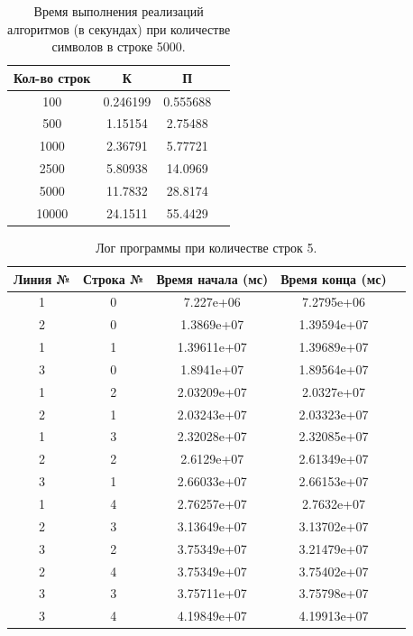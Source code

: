 \begin{table}[ht]
    \caption{\centering Время выполнения реализаций алгоритмов (в секундах) при количестве символов в строке 5000.}
    \centering
    \begin{tabular}{|c|c|c|c|}
    \hline
    Кол-во строк & К      & П     \\ \hline
    100    & 0.246199 & 0.555688 \\ \hline
    500    & 1.15154 & 2.75488  \\ \hline
    1000    & 2.36791  & 5.77721  \\ \hline
    2500    & 5.80938  & 14.0969  \\ \hline
    5000    & 11.7832  & 28.8174  \\ \hline
    10000    & 24.1511  & 55.4429  \\ \hline
 
    \end{tabular}
    \label{tab:time_best}
\end{table}


\begin{table}[ht]
    \caption{\centering Лог программы при количестве строк 5.}
    \centering
    \begin{tabular}{|c|c|c|c|c|}
    \hline
    Линия № & Строка №     & Время начала (мс)  & Время конца (мс)  \\ \hline
    1    & 0 & 7.227e+06   & 7.2795e+06 \\ \hline
    2    & 0 & 1.3869e+07   & 1.39594e+07\\ \hline
    1    & 1 & 1.39611e+07   & 1.39689e+07\\ \hline
    3    & 0 & 1.8941e+07 & 1.89564e+07 \\ \hline
    1    & 2 & 2.03209e+07  & 2.0327e+07\\ \hline
    2    & 1 & 2.03243e+07  & 2.03323e+07\\ \hline
    1    & 3 & 2.32028e+07  & 2.32085e+07\\ \hline
    2    & 2 & 2.6129e+07  & 2.61349e+07\\ \hline
    3    & 1 & 2.66033e+07  & 2.66153e+07\\ \hline
    1    & 4 & 2.76257e+07  & 2.7632e+07\\ \hline
    2    & 3 & 3.13649e+07  &3.13702e+07\\ \hline
    3    & 2 & 3.75349e+07  & 3.21479e+07\\ \hline
    2    & 4 & 3.75349e+07  & 3.75402e+07\\ \hline
    3    & 3 &3.75711e+07  & 3.75798e+07\\ \hline
    3    & 4 & 4.19849e+07  & 4.19913e+07\\ \hline
    \end{tabular}
    \label{tab:time_log}
\end{table}

